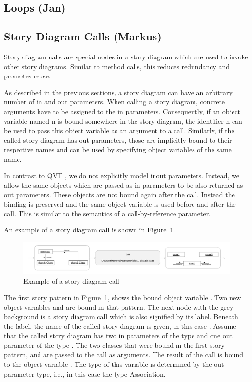 \subsection{Loops (Jan)}

\subsection{Story Diagram Calls (Markus)}

Story diagram calls are special nodes in a story diagram which are used to invoke other story diagrams. Similar to method calls, this reduces redundancy and promotes reuse.

As described in the previous sections, a story diagram can have an arbitrary number of in and out parameters. When calling a story diagram, concrete arguments have to be assigned to the in parameters. Consequently, if an object variable named n is bound somewhere in the story diagram, the identifier n can be used to pass this object variable as an argument to a call. Similarly, if the called story diagram has out parameters, those are implicitly bound to their respective names and can be used by specifying object variables of the same name.

In contrast to QVT \cite{QVT}, we do not explicitly model inout parameters. Instead, we allow the same objects which are passed as in parameters to be also returned as out parameters.
These objects are not bound again after the call. Instead the binding is preserved and the same object variable is used before and after the call. This is similar to the semantics of a call-by-reference parameter.

An example of a story diagram call is shown in Figure~\ref{fig:call}.

\begin{figure}[htb]
\begin{center}
  \includegraphics[width=\textwidth]{figures/StoryDiagramCall}
  \caption{Example of a story diagram call}
  \label{fig:call}
\end{center}
\end{figure}

The first story pattern in Figure~\ref{fig:call}, shows the bound object variable . Two new object variables  and  are bound in that pattern. The next node with the grey background is a story diagram call which is also signified by its label. Beneath the label, the name of the called story diagram is given, in this case . Assume that the called story diagram has two in parameters of the type  and one out parameter of the type . The two classes that were bound in the first story pattern,  and  are passed to the call as arguments.
The result of the call is bound to the object variable . The type of this variable is determined by the out parameter type, i.e., in this case the type Association.

